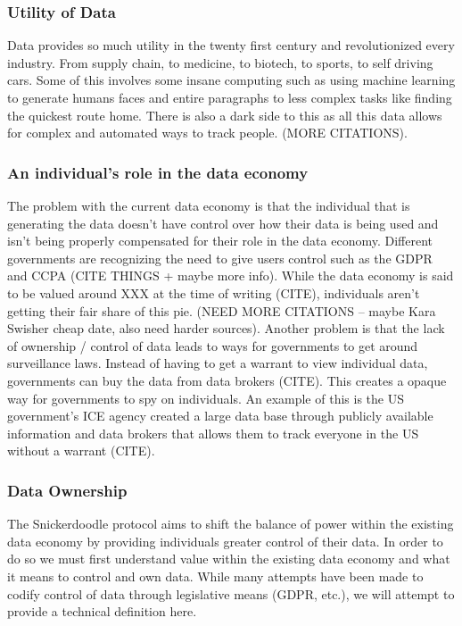 \subsubsection{Utility of Data}


Data provides so much utility in the twenty first century and revolutionized every industry. From supply chain, to medicine, to biotech, to sports, to self driving cars. Some of this involves some insane computing such as using machine learning to generate humans faces and entire paragraphs to less complex tasks like finding the quickest route home. There is also a dark side to this as all this data allows for complex and automated ways to track people. (MORE CITATIONS). 

\subsubsection{An individual's role in the data economy} 
The problem with the current data economy is that the individual that is generating the data doesn't have control over how their data is being used and isn't being properly compensated for their role in the data economy. Different governments are recognizing the need to give users control such as the GDPR and CCPA (CITE THINGS + maybe more info). While the data economy is said to be valued around XXX at the time of writing (CITE), individuals aren't getting their fair share of this pie. (NEED MORE CITATIONS -- maybe Kara Swisher cheap date, also need harder sources). 
\newline
\newline
Another problem is that the lack of ownership / control of data leads to ways for governments to get around surveillance laws. Instead of having to get a warrant to view individual data, governments can buy the data from data brokers (CITE). This creates a opaque way for governments to spy on individuals. An example of this is the US government's ICE agency created a large data base through publicly available information and data brokers that allows them to track everyone in the US without a warrant (CITE). 

\subsubsection{Data Ownership}
The Snickerdoodle protocol aims to shift the balance of power within the existing data economy by providing individuals greater control of their data. In order to do so we must first understand value within the existing data economy and what it means to control and own data. While many attempts have been made to codify control of data through legislative means (GDPR, etc.), we will attempt to provide a technical definition here.

